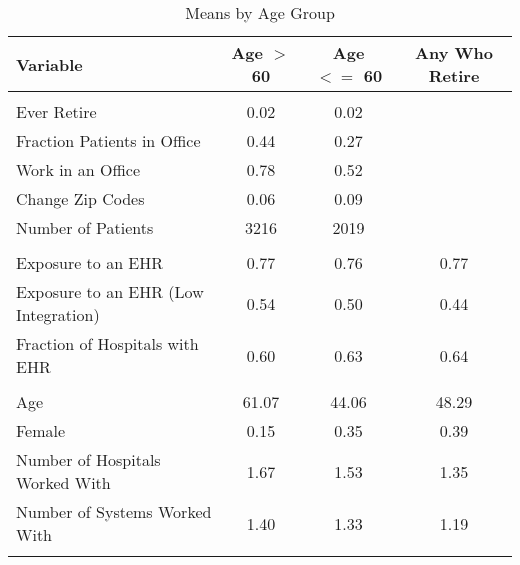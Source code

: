 \begin{table}[ht]

\caption{Means by Age Group}
\centering
\begin{tabular}[t]{lccc}
\toprule
Variable & Age $>$ 60 & Age $<=$ 60 & Any Who Retire\\
\midrule
\addlinespace[0.3em]
\multicolumn{4}{l}{\textbf{Outcomes}}\\
\hspace{1em}Ever Retire & 0.02 & 0.02 & \\
\hspace{1em}Fraction Patients in Office & 0.44 & 0.27 & \\
\hspace{1em}Work in an Office & 0.78 & 0.52 &\\
\hspace{1em}Change Zip Codes & 0.06 & 0.09 &\\
\hspace{1em}Number of Patients & 3216 & 2019 &\\
\addlinespace[0.3em]
\multicolumn{4}{l}{\textbf{Treatment}}\\
\hspace{1em}Exposure to an EHR & 0.77 & 0.76 & 0.77\\
\hspace{1em}Exposure to an EHR (Low Integration) & 0.54 & 0.50 & 0.44\\
\hspace{1em}Fraction of Hospitals with EHR & 0.60 & 0.63 & 0.64\\
\addlinespace[0.3em]
\multicolumn{4}{l}{\textbf{Characteristics}}\\
\hspace{1em}Age & 61.07 & 44.06 & 48.29\\
\hspace{1em}Female & 0.15 & 0.35 & 0.39\\
\hspace{1em}Number of Hospitals Worked With & 1.67 & 1.53 & 1.35\\
\hspace{1em}Number of Systems Worked With & 1.40 & 1.33 & 1.19\\
\bottomrule
\label{tab:splitstats}
\end{tabular}
\end{table}
